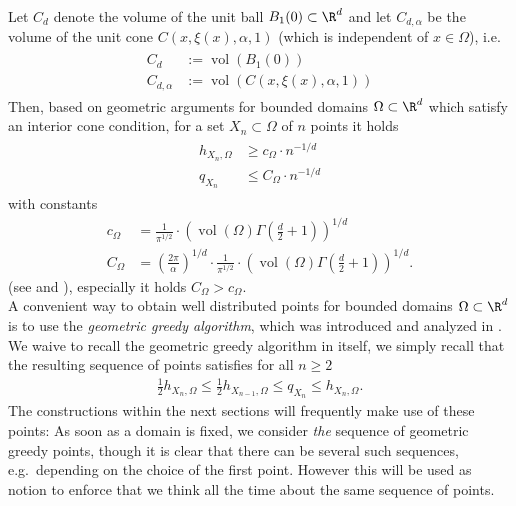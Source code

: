 \documentclass[a4paper, 10pt]{article}
\DeclareMathOperator{\vol}{vol}
\begin{document}
Let $C_d$ denote the volume of the unit ball $B_1(0) \subset \R^d$ and let $C_{d, \alpha}$ be the volume of the unit cone $C(x, \xi(x), \alpha, 1)$ (which is independent of $x \in \Omega$), i.e.\
\begin{align}
\label{eq:constants_ball_cone}
\begin{aligned}
C_d &:= \vol(B_1(0)) \\
C_{d, \alpha} &:= \vol(C(x, \xi(x), \alpha, 1))
\end{aligned}
\end{align}
Then, based on geometric arguments for bounded domains $\Omega \subset \R^d$ which satisfy an interior cone condition, for a set $X_n \subset \Omega$ of $n$ points it holds
\begin{align}
\label{eq:geometric_bounds}
\begin{aligned}
h_{X_n, \Omega} &\geq c_{\Omega} \cdot n^{-1/d} \\
q_{X_n} &\leq C_{\Omega} \cdot n^{-1/d}
\end{aligned}
\end{align}
with constants
\begin{align*}
c_\Omega &= \frac{1}{\pi^{1/2}} \cdot \left( \vol(\Omega) \Gamma \left( \frac{d}{2} + 1 \right) \right)^{1/d} \\
C_\Omega &= \left( \frac{2\pi}{\alpha} \right)^{1/d} \cdot \frac{1}{\pi^{1/2}} \cdot \left( \vol(\Omega) \Gamma \left( \frac{d}{2} + 1 \right) \right)^{1/d}.
\end{align*}
(see \cite[Satz 2.1.6]{mueller2009komplexitaet} and \cite[Satz 2.1.7]{mueller2009komplexitaet}), especially it holds $C_\Omega > c_\Omega$. \\



A convenient way to obtain well distributed points for bounded domains $\Omega \subset \R^d$ is to use the \textit{geometric greedy algorithm}, which was introduced and analyzed in \cite{marchi2005optimal}.
We waive to recall the geometric greedy algorithm in itself, we simply recall that the resulting sequence of points satisfies for all $n \geq 2$ \cite[Lemma 5.1]{marchi2005optimal}
\begin{align}
\label{eq:geometric_uniformity}
\frac{1}{2} h_{X_n, \Omega} \leq \frac{1}{2} h_{X_{n-1}, \Omega} \leq q_{X_n} \leq h_{X_n, \Omega}.
\end{align}
%
%
The constructions within the next sections will frequently make use of these points:
As soon as a domain is fixed, we consider \textit{the} sequence of geometric greedy points, though it is clear that there can be several such sequences, e.g.\ depending on the choice of the first point.
However this will be used as notion to enforce that we think all the time about the same sequence of points.
\end{document}

